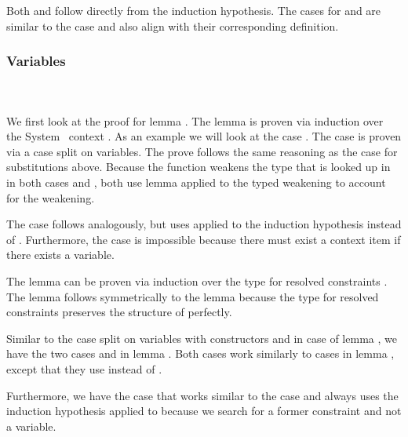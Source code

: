 \noindent Both  and  follow directly from the induction hypothesis. 
The cases for  and  are similar to the case  and also align with their corresponding definition.
\newpage
\subsubsection{Variables}\hfill\\\\
We first look at the proof for lemma . 
The lemma is proven via induction over the System \Fo\ context . 
\DPTVarPresLookup
As an example we will look at the case   . The case is proven via a case split on variables. 
The prove follows the same reasoning as the  case for substitutions above. 
Because the function  weakens the type  that is looked up in  in both cases  and , both use lemma  applied to the typed weakening  to account for the weakening. 

\noindent The case    follows analogously, but uses  applied to the induction hypothesis instead of . Furthermore, the case  is impossible because there must exist a context item if there exists a variable.

\noindent The lemma  can be proven via induction over the type for resolved constraints \Data{[}  \Data{]∈} . The lemma follows symmetrically to the lemma  because the type for resolved constraints preserves the structure of  perfectly.

\DPTOVarPresLookup
Similar to the case split on variables with constructors  and  in case    of lemma , we have the two cases  and  in lemma . Both cases work similarly to cases in lemma , except that they use  instead of .

\noindent Furthermore, we have the case  that works similar to the case    and always uses the induction hypothesis applied to  because we search for a former constraint and not a variable.